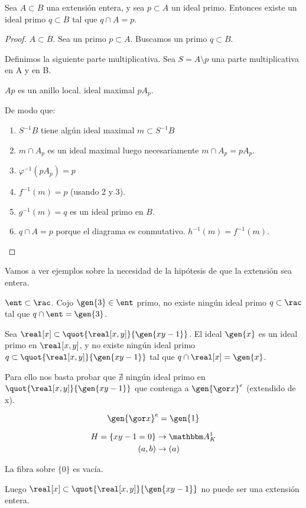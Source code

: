 \begin{prop}
	Sea $A \subset B$ una extensión entera, y sea $p \subset A$ un ideal primo. Entonces existe un ideal primo $q \subset B$ tal que $q \cap A=p$.
\end{prop}

\begin{proof}
	$A \subset B$. Sea un primo $p \subset A$. Buscamos un primo $q \subset B$.
	
	Definimos la siguiente parte multiplicativa. Sea $S=A \setminus p$ una parte multiplicativa en A y en B.
	
	
	$Ap$ es un anillo local. ideal maximal $pA_p$.
	
	De modo que:
	\begin{enumerate}
	 	\item $S^{-1}B$ tiene algún ideal maximal $m \subset S^{-1}B$
	 	\item $m \cap A_p$ es un ideal maximal luego necesariamente $m \cap A_p=pA_p$.
		\item $\varphi^{-1}(pA_p)=p$
		\item $f^{-1}(m)=p$ (usando 2 y 3).
		\item $g^{-1}(m)=q$ es un ideal primo en $B$.
		\item $q \cap A = p$ porque el diagrama es conmutativo. $h^{-1}(m)=f^{-1}(m)$.
	\end{enumerate}
\end{proof}

Vamos a ver ejemplos sobre la necesidad de la hipótesis de que la extensión sea entera.
\begin{example}
	$\ent \subset \rac $. Cojo $\gen{3} \in \ent$ primo, no existe ningún ideal primo $q \subset \rac$ tal que $q \cap \ent = \gen{3}$.
\end{example}

\begin{example}
	Sea $\real[x] \subset \quot{\real[x,y]}{\gen{xy-1}}$. El ideal $\gen{x}$ es un ideal primo en $\real[x,y]$, y no existe ningún ideal primo $q \subset  \quot{\real[x,y]}{\gen{xy-1}}$ tal que $q \cap \real[x]=\gen{x}$.
	
	Para ello nos basta probar que $\nexists$ ningún ideal primo en $ \quot{\real[x,y]}{\gen{xy-1}}$ que contenga a $\gen{\cls{x}}^e$ (extendido de x).
	
	$$ \gen{\cls{x}}^e=\gen{1}$$
	
	\begin{align*}
		H=\{xy-1=0\} & \rightarrow \A^1_K \\
		(a,b) & \rightarrow (a)
	\end{align*}
	
	La fibra sobre $\{0\}$ es vacía.
	
	Luego $\real[x] \subset \quot{\real[x,y]}{\gen{xy-1}}$ no puede ser una extensión entera.
\end{example}

